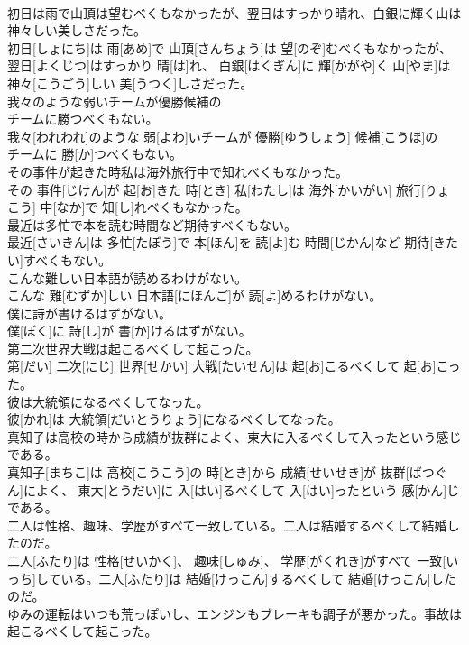 \documentclass[8pt]{extreport}
\begin{document}
\begin{CJK}{UTF8}{min}
\\	初日は雨で山頂は望むべくもなかったが、翌日はすっかり晴れ、白銀に輝く山は神々しい美しさだった。	
\\	初日[しょにち]は 雨[あめ]で 山頂[さんちょう]は 望[のぞ]むべくもなかったが、 翌日[よくじつ]はすっかり 晴[は]れ、 白銀[はくぎん]に 輝[かがや]く 山[やま]は 神々[こうごう]しい 美[うつく]しさだった。
\\	我々のような弱いチームが優勝候補の
\\	チームに勝つべくもない。	
\\	我々[われわれ]のような 弱[よわ]いチームが 優勝[ゆうしょう] 候補[こうほ]の 
\\	チームに 勝[か]つべくもない。
\\	その事件が起きた時私は海外旅行中で知れべくもなかった。	
\\	その 事件[じけん]が 起[お]きた 時[とき] 私[わたし]は 海外[かいがい] 旅行[りょこう] 中[なか]で 知[し]れべくもなかった。
\\	最近は多忙で本を読む時間など期待すべくもない。	
\\	最近[さいきん]は 多忙[たぼう]で 本[ほん]を 読[よ]む 時間[じかん]など 期待[きたい]すべくもない。
\\	こんな難しい日本語が読めるわけがない。	
\\	こんな 難[むずか]しい 日本語[にほんご]が 読[よ]めるわけがない。
\\	僕に詩が書けるはずがない。	
\\	僕[ぼく]に 詩[し]が 書[か]けるはずがない。
\\	第二次世界大戦は起こるべくして起こった。	
\\	第[だい] 二次[にじ] 世界[せかい] 大戦[たいせん]は 起[お]こるべくして 起[お]こった。
\\	彼は大統領になるべくしてなった。	
\\	彼[かれ]は 大統領[だいとうりょう]になるべくしてなった。
\\	真知子は高校の時から成績が抜群によく、東大に入るべくして入ったという感じである。	
\\	真知子[まちこ]は 高校[こうこう]の 時[とき]から 成績[せいせき]が 抜群[ばつぐん]によく、 東大[とうだい]に 入[はい]るべくして 入[はい]ったという 感[かん]じである。
\\	二人は性格、趣味、学歴がすべて一致している。二人は結婚するべくして結婚したのだ。	
\\	二人[ふたり]は 性格[せいかく]、 趣味[しゅみ]、 学歴[がくれき]がすべて 一致[いっち]している。二人[ふたり]は 結婚[けっこん]するべくして 結婚[けっこん]したのだ。
\\	ゆみの運転はいつも荒っぽいし、エンジンもブレーキも調子が悪かった。事故は起こるべくして起こった。	

\end{CJK}
\end{document}
